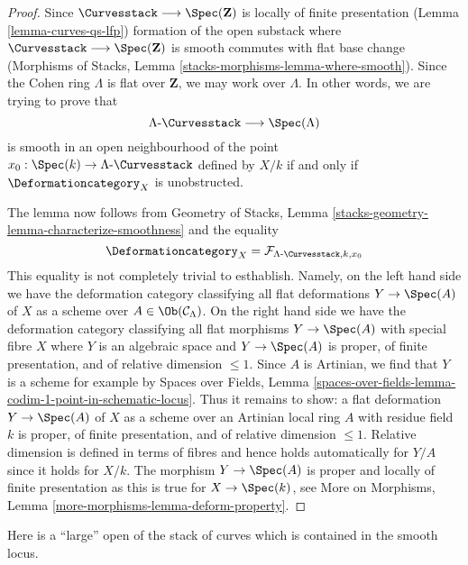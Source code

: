\begin{proof}
Since $\Curvesstack \longrightarrow \Spec(\mathbf{Z})$ is locally
of finite presentation (Lemma \ref{lemma-curves-qs-lfp})
formation of the open substack where
$\Curvesstack \longrightarrow \Spec(\mathbf{Z})$ is smooth commutes with
flat base change
(Morphisms of Stacks, Lemma \ref{stacks-morphisms-lemma-where-smooth}).
Since the Cohen ring $\Lambda$ is flat over $\mathbf{Z}$,
we may work over $\Lambda$. In other words, we are trying to prove that
$$
\Lambda\text{-}\Curvesstack \longrightarrow \Spec(\Lambda)
$$
is smooth in an open neighbourhood of the point
$x_0 : \Spec(k) \to \Lambda\text{-}\Curvesstack$
defined by $X/k$ if and only if $\Deformationcategory_X$ is unobstructed.

\medskip\noindent
The lemma now follows from
Geometry of Stacks, Lemma \ref{stacks-geometry-lemma-characterize-smoothness}
and the equality
$$
\Deformationcategory_X =
\mathcal{F}_{\Lambda\text{-}\Curvesstack, k, x_0}
$$
This equality is not completely trivial to esthablish. Namely, on the left
hand side we have the deformation category classifying all flat deformations
$Y \to \Spec(A)$ of $X$ as a scheme over $A \in \Ob(\mathcal{C}_\Lambda)$.
On the right hand side we have the deformation category classifying all
flat morphisms $Y \to \Spec(A)$ with special fibre $X$
where $Y$ is an algebraic space and
$Y \to \Spec(A)$ is proper, of finite presentation, and of
relative dimension $\leq 1$. Since $A$ is Artinian, we find
that $Y$ is a scheme for example by Spaces over Fields, Lemma
\ref{spaces-over-fields-lemma-codim-1-point-in-schematic-locus}.
Thus it remains to show: a flat deformation $Y \to \Spec(A)$ of
$X$ as a scheme over an Artinian local ring $A$ with residue field $k$
is proper, of finite presentation, and of relative dimension $\leq 1$.
Relative dimension is defined in terms of fibres and hence holds
automatically for $Y/A$ since it holds for $X/k$.
The morphism $Y \to \Spec(A)$ is proper and locally of finite presentation
as this is true for $X \to \Spec(k)$, see
More on Morphisms, Lemma \ref{more-morphisms-lemma-deform-property}.
\end{proof}

\noindent
Here is a ``large'' open of the stack of curves which is contained
in the smooth locus.

